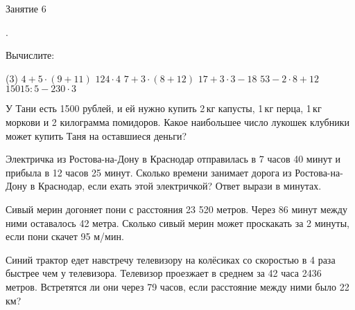\begin{class}[number=6]
	\begin{listofex}
		\item Занятие 6
	\end{listofex}
\end{class}

\begin{homework}[number=3]
	\begin{listofex}
		\item .
	\end{listofex}
\end{homework}

\begin{class}[number=7]
	\begin{listofex}
		\item Вычислите:
		\begin{tasks}(3)
			\task \( 4 + 5 \cdot (9 + 11) \)
			\task \( 124\cdot4 \)
			\task \( 7 + 3 \cdot (8 + 12) \)
			\task \( 17 + 3 \cdot 3 - 18 \)
			\task \( 53 - 2\cdot 8 + 12 \)
			\task \( 15015 : 5 - 230 \cdot 3 \)
		\end{tasks}
		\item У Тани есть 1500 рублей, и ей нужно купить 2 кг капусты, 1 кг перца, 1 кг моркови и 2 килограмма помидоров. Какое наибольшее число лукошек клубники может купить Таня на оставшиеся деньги?
		\begin{figure}[h]
		\end{figure}
		
		\item Электричка из Ростова-на-Дону в Краснодар отправилась в 7 часов 40 минут и прибыла в 12 часов 25 минут. Сколько времени занимает дорога из Ростова-на-Дону в Краснодар, если ехать этой электричкой? Ответ вырази в минутах.
		\item Сивый мерин догоняет пони с расстояния 23 520 метров. Через 86 минут между ними оставалось 42 метра. Сколько сивый мерин может проскакать за 2 минуты, если пони скачет 95 м/мин.
		\item Синий трактор едет навстречу телевизору на колёсиках со скоростью в 4 раза быстрее чем у телевизора. Телевизор проезжает в среднем за 42 часа 2436 метров. Встретятся ли они через 79  часов, если расстояние между ними было 22 км?
		
	\end{listofex}
\end{class}

